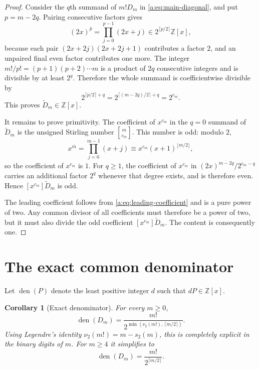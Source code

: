\documentclass[11pt,a4paper,oneside,openany]{book}
\numberwithin{equation}{chapter}
\newtheorem{corollary}[theorem]{Corollary}
\theoremstyle{definition}
\theoremstyle{remark}
\newcommand{\Z}{\mathbb Z}
\newcommand{\bitsum}{s_2}
\newcommand{\rising}[2]{#1^{\overline{#2}}}
\newcommand{\vtwo}{\nu_2}
\newcommand{\Diag}{D}
\newcommand{\Dprim}{\widetilde D}
\begin{document}
\begin{proof}
Consider the $q$th summand of $m!\Diag_m$ in
\eqref{a:eq:main-diagonal}, and put $p=m-2q$.  Pairing consecutive factors gives
\[
 \rising{(2x)}p
 =\prod_{j=0}^{p-1}(2x+j)
 \in 2^{\lceil p/2\rceil}\Z[x],
\]
because each pair $(2x+2j)(2x+2j+1)$ contributes a factor $2$, and an
unpaired final even factor contributes one more.  The integer
$m!/p!=(p+1)(p+2)\cdots m$ is a product of $2q$ consecutive integers and is
divisible by at least $2^q$.  Therefore the whole summand is coefficientwise
divisible by
\[
 2^{\lceil p/2\rceil+q}
 =2^{\lceil(m-2q)/2\rceil+q}
 =2^{c_m}.
\]
This proves $\Dprim_m\in\Z[x]$.

It remains to prove primitivity.  The coefficient of $x^{c_m}$ in the
$q=0$ summand of $\Dprim_m$ is the unsigned Stirling number
$\genfrac{[}{]}{0pt}{}{m}{c_m}$.  This number is odd: modulo $2$,
\[
 \rising xm=\prod_{j=0}^{m-1}(x+j)
 \equiv x^{c_m}(x+1)^{\lfloor m/2\rfloor},
\]
so the coefficient of $x^{c_m}$ is $1$.  For $q\ge1$, the coefficient of
$x^{c_m}$ in
$\rising{(2x)}{m-2q}/2^{c_m-q}$ carries an additional factor $2^q$ whenever
that degree exists, and is therefore even.  Hence $[x^{c_m}]\Dprim_m$ is odd.

The leading coefficient follows from \eqref{a:eq:leading-coefficient} and is a pure power
of two.  Any common divisor of all coefficients must therefore be a power of
two, but it must also divide the odd coefficient $[x^{c_m}]\Dprim_m$.  The content
is consequently one.
\end{proof}

\section{The exact common denominator}

Let $\operatorname{den}(P)$ denote the least positive integer $d$ such that
$dP\in\Z[x]$.

\begin{corollary}[Exact denominator]
\label{b:cor:denominator}
For every $m\ge0$,
\begin{equation}
 \boxed{\quad
 \operatorname{den}(\Diag_m)
 =\frac{m!}{2^{\min(\vtwo(m!),\,\lceil m/2\rceil)}}.
 \quad}
 \label{b:eq:denominator}
\end{equation}
Using Legendre's identity $\vtwo(m!)=m-\bitsum(m)$, this is completely
explicit in the binary digits of $m$.  For $m\ge4$ it simplifies to
\begin{equation}
 \operatorname{den}(\Diag_m)=\frac{m!}{2^{\lceil m/2\rceil}}.
 \label{b:eq:denominator-large}
\end{equation}
\end{corollary}
\end{document}

